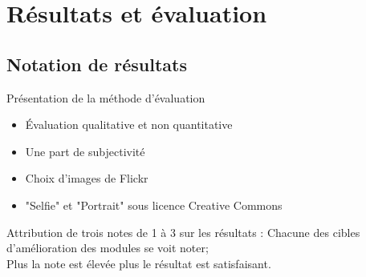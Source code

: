 \documentclass{beamer}
\begin{document}
\section{Résultats et évaluation}

\subsection{Notation de résultats}

\begin{frame}{Présentation de la méthode d'évaluation}
\begin{itemize}
\item Évaluation qualitative et non quantitative
\item Une part de subjectivité
\item Choix d'images de Flickr 
\item "Selfie" et "Portrait" sous licence Creative Commons
\end{itemize}
\pause
\begin{block}{Attribution de trois notes de 1 à 3 sur les résultats : }
Chacune des cibles d'amélioration des modules se voit noter;
\\Plus la note est élevée plus le résultat est satisfaisant.
\end{block}
\end{frame}
\end{document}
